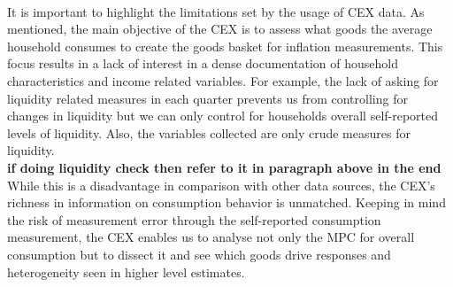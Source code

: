 \\ It is important to highlight the limitations set by the usage of CEX data. As mentioned, the main objective of the CEX is to assess what goods the average household consumes to create the goods basket for inflation measurements. This focus results in a lack of interest in a dense documentation of household characteristics and income related variables. For example, the lack of asking for liquidity related measures in each quarter prevents us from controlling for changes in liquidity but we can only control for households overall self-reported levels of liquidity. Also, the variables collected are only crude measures for liquidity. \\ 
\textbf{if doing liquidity check then refer to it in paragraph above in the end}
\\
While this is a disadvantage in comparison with other data sources, the CEX's richness in information on consumption behavior is unmatched. Keeping in mind the risk of measurement error through the self-reported consumption measurement, the CEX enables us to analyse not only the MPC for overall consumption but to dissect it and see which goods drive responses and heterogeneity seen in higher level estimates.